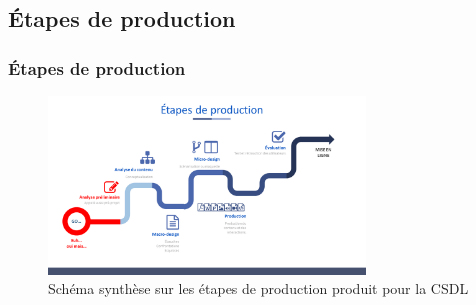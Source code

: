 					
					
					 \subsection{Étapes de production}
					  
						\begin{frame}[allowframebreaks]
						\frametitle{Étapes de production}
						\begin{figure}
                     			\centering
                    			 \includegraphics[width = 0.75\textwidth]{etapes.png}
                     			\caption{\tiny{Schéma synthèse sur les étapes de production produit pour la CSDL}}
                   			\end{figure}
                   			

\end{frame}
